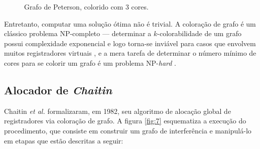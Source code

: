 \documentclass[
	12pt,				%
	openright,			%
	oneside,			%
	a4paper,			%
	tccpreliminar,			%
	]{ABNT-DC-UEL}
\begin{document}
\begin{figure}[ht]
    \centering
    
    \caption{Grafo de Peterson, colorido com 3 cores.}
    \label{fig:5}
\end{figure}

Entretanto, computar uma solução ótima não é trivial. A coloração de grafo é um clássico problema NP-completo \cite{karp:72} --- determinar a $k$-colorabilidade de um grafo possui complexidade exponencial e logo torna-se inviável para casos que envolvem muitos registradores virtuais \cite{lawler:76, bjorklund:09}, e a mera tarefa de determinar o número mínimo de cores para se colorir um grafo é um problema NP-\textit{hard} \cite{garey:76}.

\subsection{Alocador de \textit{Chaitin}}

Chaitin \textit{et al.} \cite{chaitin:82} formalizaram, em 1982, seu algoritmo de alocação global de registradores via coloração de grafo. A figura \ref{fig:7} esquematiza a execução do procedimento, que consiste em construir um grafo de interferência e manipulá-lo em etapas que estão descritas a seguir:
\end{document}
